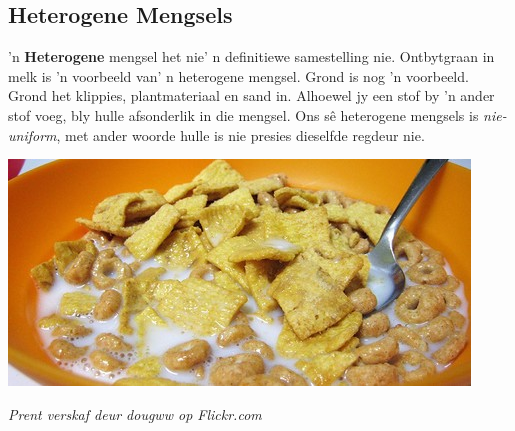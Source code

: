             \subsection*{Heterogene Mengsels}
            \nopagebreak
        \label{m38708*id62715}'n \textbf{Heterogene} mengsel het nie' n definitiewe samestelling nie. Ontbytgraan in melk is 'n voorbeeld van' n heterogene mengsel. Grond is nog 'n voorbeeld. Grond het klippies, plantmateriaal en sand in. Alhoewel jy een stof by 'n ander stof voeg, bly hulle afsonderlik in die mengsel. Ons s\^e heterogene mengsels is \textsl{nie-uniform}, met ander woorde hulle is nie presies dieselfde regdeur nie.\par 
\begin{minipage}{.5\textwidth}
\begin{center}
 \includegraphics[width=.8\textwidth]{photos/mixtureby-dougww-flickr.jpg}\par
\textit{Prent verskaf deur dougww op Flickr.com}
\end{center}
\end{minipage}
